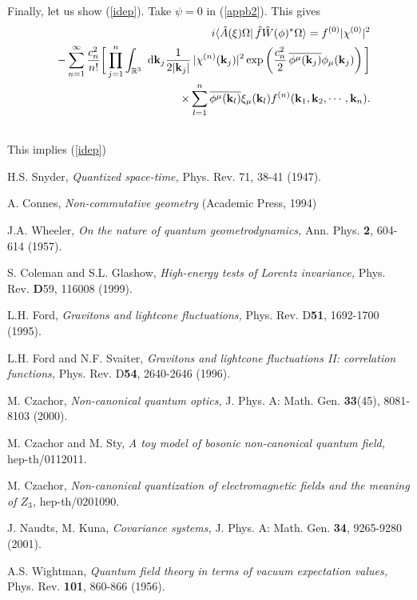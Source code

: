 \documentclass[12pt,a4paper]{article}
\def\Ro{{\mathbb R}}
\def\kk{{\bf k}}
\begin{document}
Finally, let us show (\ref{idep}).
Take $\psi=0$ in (\ref{appb2}). This gives
\begin{eqnarray}
& &i\langle\hat A(\xi)\Omega|\,\hat f\hat W(\phi)^*\Omega\rangle
=f^{(0)}|\chi^{(0)}|^2\cr
& &
-\sum_{n=1}^\infty\frac{c_n^2}{n!}\bigg[\prod_{j=1}^n\int_{\Ro^3}\hbox{ d}\kk_j
\frac{1}{2|\kk_j|}\,|\chi^{(n)}(\kk_j)|^2
\exp\left(
\frac{c_n^2}{2}\,\overline{\phi^\mu(\kk_j)}
\phi_\mu(\kk_j)
\right)\bigg]
\cr
& &\times 
\sum_{l=1}^n
\overline{\phi^\mu(\kk_l)}\xi_\mu(\kk_l)
f^{(n)}(\kk_1,\kk_2,\cdots,\kk_n).\cr
& &
\label{appb3}
\end{eqnarray}
This implies (\ref{idep})


\begin{thebibliography}{99}

\parskip 2pt

 H.S. Snyder, {\sl Quantized space-time,} Phys. Rev. 71, 38-41 (1947).

 A. Connes, {\sl Non-commutative geometry}
(Academic Press, 1994)

 J.A. Wheeler, {\sl On the nature of quantum geometrodynamics,}
Ann. Phys. {\bf 2}, 604-614 (1957).

 S. Coleman and S.L. Glashow, {\sl High-energy tests of Lorentz
invariance,} Phys. Rev. {\bf D}59, 116008 (1999).

 L.H. Ford, {\sl Gravitons and lightcone fluctuations,} 
Phys. Rev. D{\bf 51}, 1692-1700 (1995).

  L.H. Ford and N.F. Svaiter, {\sl Gravitons and
lightcone fluctuations II: correlation functions,}
Phys. Rev. D{\bf 54}, 2640-2646 (1996).

 M. Czachor, {\sl Non-canonical quantum optics,}
J. Phys. A: Math. Gen. {\bf 33}(45), 8081-8103 (2000).

 M. Czachor and M. Sty, {\sl A toy model of bosonic
non-canonical quantum field,} hep-th/0112011.

 M. Czachor, {\sl Non-canonical quantization of
electromagnetic fields and the meaning of $Z_3$,}
hep-th/0201090.

 J. Naudts, M. Kuna, {\sl Covariance systems,} J. 
Phys. A: Math. Gen. {\bf 34}, 9265-9280 (2001).

 A.S. Wightman, {\sl Quantum field theory in terms of vacuum
expectation values,} Phys. Rev. {\bf 101}, 860-866 (1956).


\end{thebibliography}
\end{document}

